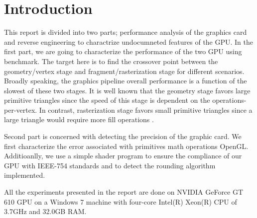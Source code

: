 \section{Introduction}
This report is divided into two parts; performance analysis of the graphics card and reverse engineering to charactrize undocumneted features of the GPU. In the first part, we are going to characterize the performance of the two GPU using \protect{\wes} benchmark. The target here is to find the crossover point between the geometry/vertex stage and fragment/rasterization stage for different scenarios. Broadly speaking, the graphics pipeline overall performance is a function of the slowest of these two stages. It is well known that the geometry stage favors large primitive triangles since the speed of this stage is dependent on the operations-per-vertex. In contrast, rasterization stage favors small primitive triangles since a large triangle would require more fill operations \cite{Bethel_2010}.

Second part is concerned with detecting the precision of the graphic card. We first characterize the error associated with primitives math operations OpenGL. Additioanlly, we use a simple shader program to ensure the compliance of our GPU with IEEE-754 standards and to detect the rounding algorithm implemented. 

All the experiments presented in the report are done on NVIDIA GeForce GT 610 GPU on a Windows 7 machine with four-core Intel(R) Xeon(R) CPU of 3.7GHz and 32.0GB RAM. 

